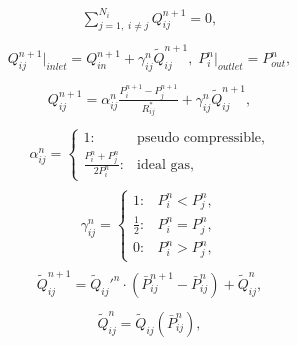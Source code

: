 \documentclass[a4paper,12pt]{extreport}
\begin{document}
    \begin{eqnarray}
        \begin{gathered}
            \sum^{N_{i}}_{j=1, \; i\neq j} Q^{n+1}_{ij} = 0,
        \end{gathered}
    \end{eqnarray}
    \begin{eqnarray}
        \begin{gathered}
            Q^{n+1}_{ij}\Big|_{inlet} = Q^{n+1}_{in}+\gamma^n_{ij} \tilde{Q}^{n+1}_{ij}, \;
            P^{n}_{i}\Big|_{outlet} = P^{n}_{out},
        \end{gathered}
    \end{eqnarray}
    \begin{eqnarray}
        \begin{gathered}
            Q^{n+1}_{ij} = \alpha^n_{ij} \frac{P^{n+1}_{i} - P^{n+1}_{j}}{R^*_{ij}} + \gamma^n_{ij} \tilde{Q}^{n+1}_{ij},
        \end{gathered}
    \end{eqnarray}
    \begin{eqnarray}
        \begin{gathered}
            \alpha^n_{ij} =\begin{cases}
                               1: &\text{pseudo compressible},\\
                               \frac{P^n_i + P^n_j}{2P^n_i}: &\text{ideal gas},
            \end{cases}
        \end{gathered}
    \end{eqnarray}
    \begin{eqnarray}
        \gamma^n_{ij} =\begin{cases}
                           1: & P^{n}_{i} < P^{n}_{j},\\
                           \frac{1}{2} : & P^{n}_{i} = P^{n}_{j},\\
                           0: & P^{n}_{i} > P^{n}_{j},
        \end{cases}
    \end{eqnarray}
    \begin{eqnarray}
        \begin{gathered}
            \tilde{Q}_{ij}^{n+1} = \tilde{Q}_{ij}'^n \cdot \left(\bar{P}_{ij}^{n+1}-\bar{P}_{ij}^n\right)+\tilde{Q}_{ij}^n,
        \end{gathered}
    \end{eqnarray}
    \begin{eqnarray}
        \begin{gathered}
            \tilde{Q}_{ij}^{n} = \tilde{Q}_{ij}\left(\bar{P}_{ij}^n\right),
        \end{gathered}
    \end{eqnarray}
\end{document}

